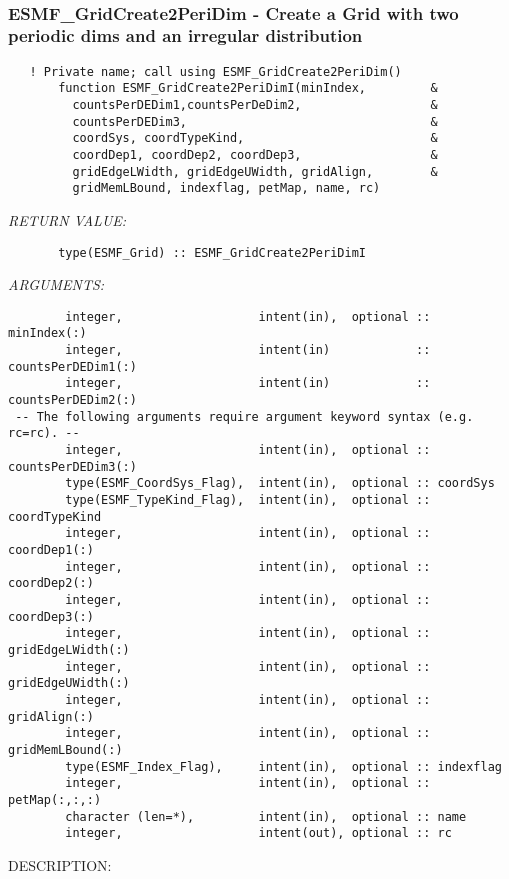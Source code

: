  
\mbox{}\hrulefill\ 
 
\subsubsection [ESMF\_GridCreate2PeriDim] {ESMF\_GridCreate2PeriDim - Create a Grid with two periodic dims and an irregular distribution}


 
\begin{verbatim}   ! Private name; call using ESMF_GridCreate2PeriDim()
       function ESMF_GridCreate2PeriDimI(minIndex,         &
         countsPerDEDim1,countsPerDeDim2,                  &
         countsPerDEDim3,                                  &
         coordSys, coordTypeKind,                          &
         coordDep1, coordDep2, coordDep3,                  &
         gridEdgeLWidth, gridEdgeUWidth, gridAlign,        &
         gridMemLBound, indexflag, petMap, name, rc)\end{verbatim}{\em RETURN VALUE:}
\begin{verbatim}       type(ESMF_Grid) :: ESMF_GridCreate2PeriDimI\end{verbatim}{\em ARGUMENTS:}
\begin{verbatim}        integer,                   intent(in),  optional :: minIndex(:)
        integer,                   intent(in)            :: countsPerDEDim1(:)
        integer,                   intent(in)            :: countsPerDEDim2(:)
 -- The following arguments require argument keyword syntax (e.g. rc=rc). --
        integer,                   intent(in),  optional :: countsPerDEDim3(:)
        type(ESMF_CoordSys_Flag),  intent(in),  optional :: coordSys
        type(ESMF_TypeKind_Flag),  intent(in),  optional :: coordTypeKind
        integer,                   intent(in),  optional :: coordDep1(:)
        integer,                   intent(in),  optional :: coordDep2(:)
        integer,                   intent(in),  optional :: coordDep3(:)
        integer,                   intent(in),  optional :: gridEdgeLWidth(:)
        integer,                   intent(in),  optional :: gridEdgeUWidth(:)
        integer,                   intent(in),  optional :: gridAlign(:)
        integer,                   intent(in),  optional :: gridMemLBound(:)
        type(ESMF_Index_Flag),     intent(in),  optional :: indexflag
        integer,                   intent(in),  optional :: petMap(:,:,:)
        character (len=*),         intent(in),  optional :: name
        integer,                   intent(out), optional :: rc\end{verbatim}
{\sf DESCRIPTION:\\ }


